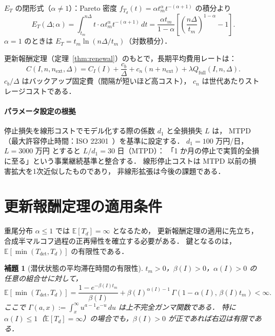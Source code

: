 \documentclass[12pt,a4paper]{article}
\theoremstyle{plain}
\newtheorem{lemma}[theorem]{補題}
\theoremstyle{definition}
\theoremstyle{remark}
\newcommand{\E}{\mathbb{E}}
\newcommand{\Qf}{Q_{\mathrm{full}}}
\newcommand{\Tdet}{T_{\mathrm{det}}}
\newcommand{\betaI}{\beta(I)}
\newcommand{\alphI}{\alpha(I)}
\begin{document}
\medskip
$E_T$ の閉形式（$\alpha\ne1$）：Pareto 密度 $f_{T_d}(t)=\alpha t_m^\alpha t^{-(\alpha+1)}$ の積分より
\begin{equation}\label{eq:ET}
E_T(\Delta;\alpha)=\int_{t_m}^{n\Delta} t\cdot\alpha t_m^\alpha t^{-(\alpha+1)}\,dt
=\frac{\alpha t_m}{1-\alpha}\!\left[\!\left(\frac{n\Delta}{t_m}\right)^{\!1-\alpha}\!-1\right].
\end{equation}
$\alpha=1$ のときは $E_T=t_m\ln(n\Delta/t_m)$（対数積分）．

更新報酬定理（定理~\ref{thm:renewal}）のもとで，長期平均費用レートは：
\begin{equation}\label{eq:cost_rate}
C(I,n,n_{\mathrm{ext}},\Delta)
= C_I(I)+\frac{c_b}{\Delta}+c_n(n+n_{\mathrm{ext}})+\lambda\Qf(I,n,\Delta).
\end{equation}
$c_b/\Delta$ はバックアップ固定費（間隔が短いほど高コスト），
$c_n$ は世代あたりストレージコストである．

\paragraph{パラメータ設定の根拠}
停止損失を線形コストでモデル化する際の係数 $d_1$ と全損損失 $L$ は，
MTPD（最大許容停止時間：ISO 22301~\cite{iso22301}）を基準に設定する．
$d_1=100$ 万円/日，$L=3000$ 万円 とすると $L/d_1=30$ 日（MTPD）：
「1 か月の停止で実質的全損に至る」という事業継続基準と整合する．
線形停止コストは MTPD 以前の損害拡大を1次近似したものであり，
非線形拡張は今後の課題である．

\section{更新報酬定理の適用条件}
\label{sec:renewal}

重尾分布 $\alpha\le1$ では $\E[T_d]=\infty$ となるため，
更新報酬定理の適用に先立ち，合成半マルコフ過程の正再帰性を確立する必要がある．
鍵となるのは，$\E[\min(\Tdet,T_d)]$ の有限性である．

\begin{lemma}[潜伏状態の平均滞在時間の有限性]\label{lem:sojourn}
$t_m>0$，$\betaI>0$，$\alphI>0$ の任意の組合せに対して，
\begin{equation}\label{eq:E_min}
\E[\min(\Tdet,T_d)]
=\frac{1-e^{-\betaI t_m}}{\betaI}
+\betaI^{\alphI-1}\,\Gamma(1-\alphI,\,\betaI t_m)<\infty.
\end{equation}
ここで $\Gamma(a,x):=\int_x^\infty u^{a-1}e^{-u}\,du$ は上不完全ガンマ関数である．
特に $\alphI\le1$（$\E[T_d]=\infty$）の場合でも，$\betaI>0$ が正であれば右辺は有限である．
\end{lemma}
\end{document}
